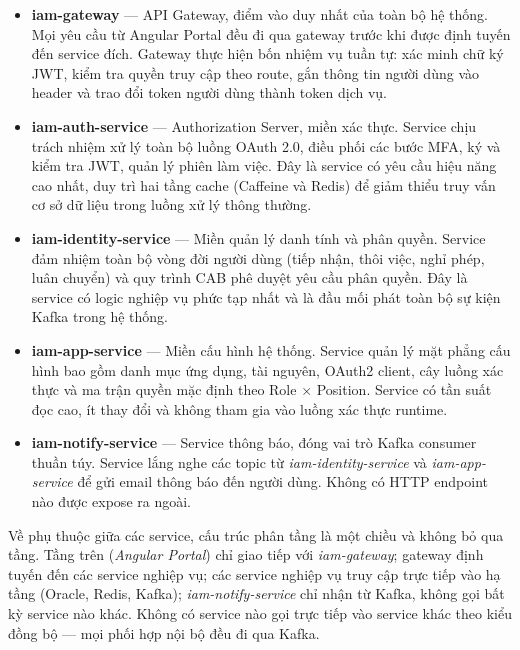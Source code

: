 \documentclass[../DoAn.tex]{subfiles}
\begin{document}
\begin{itemize}
  \item \textbf{iam-gateway} --- API Gateway, điểm vào duy nhất của toàn bộ hệ thống. Mọi yêu cầu từ Angular Portal đều đi qua gateway trước khi được định tuyến đến service đích. Gateway thực hiện bốn nhiệm vụ tuần tự: xác minh chữ ký JWT, kiểm tra quyền truy cập theo route, gắn thông tin người dùng vào header và trao đổi token người dùng thành token dịch vụ.

  \item \textbf{iam-auth-service} --- Authorization Server, miền xác thực. Service chịu trách nhiệm xử lý toàn bộ luồng OAuth 2.0, điều phối các bước MFA, ký và kiểm tra JWT, quản lý phiên làm việc. Đây là service có yêu cầu hiệu năng cao nhất, duy trì hai tầng cache (Caffeine và Redis) để giảm thiểu truy vấn cơ sở dữ liệu trong luồng xử lý thông thường.

  \item \textbf{iam-identity-service} --- Miền quản lý danh tính và phân quyền. Service đảm nhiệm toàn bộ vòng đời người dùng (tiếp nhận, thôi việc, nghỉ phép, luân chuyển) và quy trình CAB phê duyệt yêu cầu phân quyền. Đây là service có logic nghiệp vụ phức tạp nhất và là đầu mối phát toàn bộ sự kiện Kafka trong hệ thống.

  \item \textbf{iam-app-service} --- Miền cấu hình hệ thống. Service quản lý mặt phẳng cấu hình bao gồm danh mục ứng dụng, tài nguyên, OAuth2 client, cây luồng xác thực và ma trận quyền mặc định theo Role $\times$ Position. Service có tần suất đọc cao, ít thay đổi và không tham gia vào luồng xác thực runtime.

  \item \textbf{iam-notify-service} --- Service thông báo, đóng vai trò Kafka consumer thuần túy. Service lắng nghe các topic từ \textit{iam-identity-service} và \textit{iam-app-service} để gửi email thông báo đến người dùng. Không có HTTP endpoint nào được expose ra ngoài.
\end{itemize}

Về phụ thuộc giữa các service, cấu trúc phân tầng là một chiều và không bỏ qua tầng. Tầng trên (\textit{Angular Portal}) chỉ giao tiếp với \textit{iam-gateway}; gateway định tuyến đến các service nghiệp vụ; các service nghiệp vụ truy cập trực tiếp vào hạ tầng (Oracle, Redis, Kafka); \textit{iam-notify-service} chỉ nhận từ Kafka, không gọi bất kỳ service nào khác. Không có service nào gọi trực tiếp vào service khác theo kiểu đồng bộ --- mọi phối hợp nội bộ đều đi qua Kafka.
\end{document}
